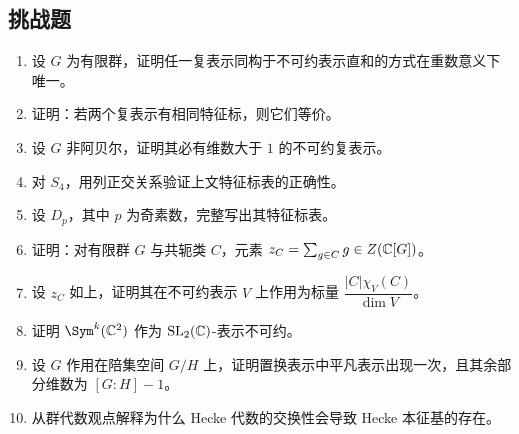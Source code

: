 \subsection*{挑战题}
\begin{enumerate}[resume, label=\textbf{\arabic*.}, leftmargin=*, itemsep=0.5em]
\item \hard 设 $G$ 为有限群，证明任一复表示同构于不可约表示直和的方式在重数意义下唯一。
\item \hard 证明：若两个复表示有相同特征标，则它们等价。
\item \hard 设 $G$ 非阿贝尔，证明其必有维数大于 $1$ 的不可约复表示。
\item \hard 对 $S_4$，用列正交关系验证上文特征标表的正确性。
\item \hard 设 $D_p$，其中 $p$ 为奇素数，完整写出其特征标表。
\item \hard 证明：对有限群 $G$ 与共轭类 $C$，元素 $z_C=\sum_{g\in C} g\in Z(\mathbb{C}[G])$。
\item \hard 设 $z_C$ 如上，证明其在不可约表示 $V$ 上作用为标量 $\dfrac{|C|\chi_V(C)}{\dim V}$。
\item \hard 证明 $\Sym^{k}(\C^2)$ 作为 $\mathrm{SL}_2(\mathbb{C})$-表示不可约。
\item \hard 设 $G$ 作用在陪集空间 $G/H$ 上，证明置换表示中平凡表示出现一次，且其余部分维数为 $[G:H]-1$。
\item \hard 从群代数观点解释为什么 Hecke 代数的交换性会导致 Hecke 本征基的存在。
\end{enumerate}

